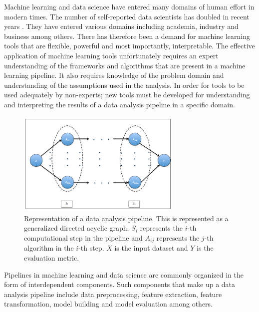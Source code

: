 Machine learning and data science have entered many domains of human effort in modern times. The number of self-reported data scientists has doubled in recent years \cite{harrison1995validity}. They have entered various domains including academia, industry and business among others. There has therefore been a demand for machine learning tools that are flexible, powerful and most importantly, interpretable. The effective application of machine learning tools unfortunately requires an expert understanding of the frameworks and algorithms that are present in a machine learning pipeline. It also requires knowledge of the problem domain and understanding of the assumptions used in the analysis. In order for tools to be used adequately by non-experts; new tools must be developed for understanding and interpreting the results of a data analysis pipeline in a specific domain.
\begin{figure}[ht!]
    \centering
    \includegraphics[width=0.7\textwidth]{img/EP/generalized_pipeline}
    \caption{Representation of a data analysis pipeline. This is represented as a generalized directed acyclic graph. $S_i$ represents the $i$-th computational step in the pipeline and $A_{ij}$ represents the $j$-th algorithm in the $i$-th step. $X$ is the input dataset and $Y$ is the evaluation metric.}
    \label{fig:pipeline}
\end{figure}
Pipelines in machine learning and data science are commonly organized in the form of interdependent components. Such components that make up a data analysis pipeline include data preprocessing, feature extraction, feature transformation, model building and model evaluation among others. 
